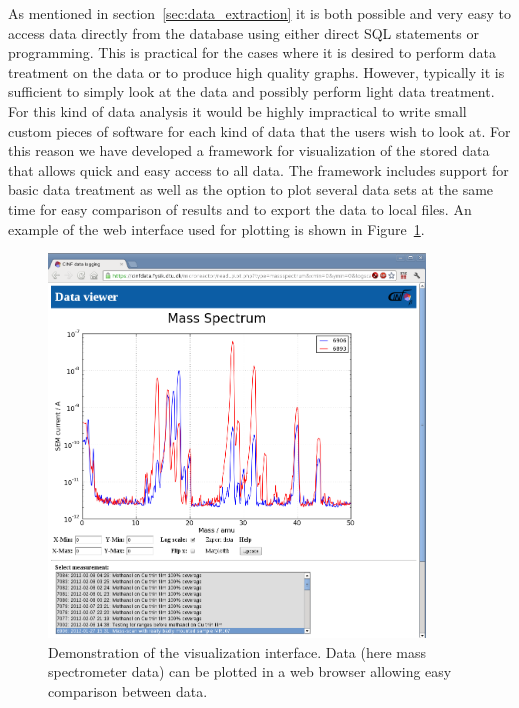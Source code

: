 As mentioned in section~\ref{sec:data_extraction} it is both possible and very
easy to access data directly from the database using either direct SQL
statements or programming. This is practical for the cases where it is
desired to perform data treatment on the data or to produce high quality
graphs. However, typically it is sufficient to simply look at the data
and possibly perform light data treatment. For this kind of data analysis it
would be highly impractical to write small custom pieces of software for each
kind of data that the users wish to look at. For this reason we have developed
a framework for visualization of the stored data that allows quick and easy
access to all data. The framework includes support for basic data treatment as
well as the option to plot several data sets at the same time for easy
comparison of results and to export the data to local files. An example of the
web interface used for plotting is shown in Figure~\ref{fig:webinterface}.
\begin{figure}
 \begin{center}
 \includegraphics[width=10cm]{mass_spectra_comparison.png}
 \caption{Demonstration of the visualization interface. Data (here mass
   spectrometer data) can be plotted in a web browser allowing
   easy comparison between data. \label{fig:webinterface}
 } 
 \end{center}
\end{figure}

